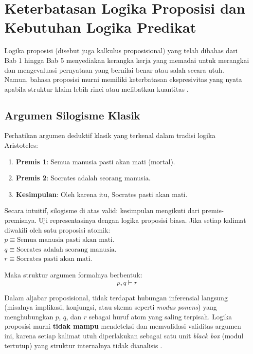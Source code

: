 \section{Keterbatasan Logika Proposisi dan Kebutuhan Logika Predikat}

Logika proposisi (disebut juga kalkulus proposisional) yang telah dibahas dari Bab 1 hingga Bab 5 menyediakan kerangka kerja yang memadai untuk merangkai dan mengevaluasi pernyataan yang bernilai benar atau salah secara utuh. Namun, bahasa proposisi murni memiliki keterbatasan ekspresivitas yang nyata apabila struktur klaim lebih rinci atau melibatkan kuantitas \cite{rosen2019}.

\subsection{Argumen Silogisme Klasik}

Perhatikan argumen deduktif klasik yang terkenal dalam tradisi logika Aristoteles:
\begin{enumerate}
    \item \textbf{Premis 1}: Semua manusia pasti akan mati (mortal).
    \item \textbf{Premis 2}: Socrates adalah seorang manusia.
    \item \textbf{Kesimpulan}: Oleh karena itu, Socrates pasti akan mati.
\end{enumerate}

Secara intuitif, silogisme di atas valid: kesimpulan mengikuti dari premis-premisnya. Uji representasinya dengan logika proposisi biasa.
Jika setiap kalimat diwakili oleh satu proposisi atomik: \\
$p \equiv \text{Semua manusia pasti akan mati.}$ \\
$q \equiv \text{Socrates adalah seorang manusia.}$ \\
$r \equiv \text{Socrates pasti akan mati.}$

Maka struktur argumen formalnya berbentuk:
\[ p, q \vdash r \]

Dalam aljabar proposisional, tidak terdapat hubungan inferensial langsung (misalnya implikasi, konjungsi, atau skema seperti \textit{modus ponens}) yang menghubungkan $p$, $q$, dan $r$ sebagai huruf atom yang saling terpisah. Logika proposisi murni \textbf{tidak mampu} mendeteksi dan memvalidasi validitas argumen ini, karena setiap kalimat utuh diperlakukan sebagai satu unit \textit{black box} (modul tertutup) yang struktur internalnya tidak dianalisis \cite{wiki_first_order_logic}.

